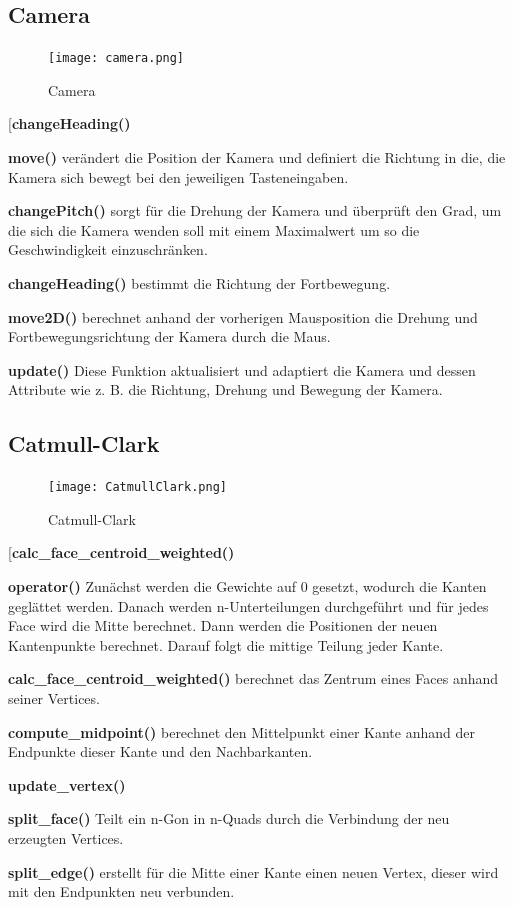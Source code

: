 \subsection{Camera}

\begin{figure}[H]
\centering
\texttt{[image: camera.png]}
\caption{Camera}
\label{fig3}
\end{figure}

\begin{labeling}[]{[\textbf{changeHeading()}}%
\item[\textbf{move()}] verändert die Position der Kamera und definiert die Richtung in die, die Kamera sich bewegt bei den jeweiligen Tasteneingaben.
\item[\textbf{changePitch()}] sorgt für die Drehung der Kamera und überprüft den Grad, um die sich die Kamera wenden soll mit einem Maximalwert um so die Geschwindigkeit einzuschränken.
\item[\textbf{changeHeading()}] bestimmt die Richtung der Fortbewegung.
\item[\textbf{move2D()}] berechnet anhand der vorherigen Mausposition die Drehung und Fortbewegungsrichtung der Kamera durch die Maus.
\item[\textbf{update()}] Diese Funktion aktualisiert und adaptiert die Kamera und dessen Attribute wie z. B. die Richtung, Drehung und Bewegung der Kamera.
\end{labeling}

\subsection{Catmull-Clark}

\begin{figure}[H]
\centering
\texttt{[image: CatmullClark.png]}
\caption{Catmull-Clark}
\label{fig4}
\end{figure}

\begin{labeling}[]{[\textbf{calc\_face\_centroid\_weighted()}}%
\item[\textbf{operator()}] Zunächst werden die Gewichte auf 0 gesetzt, wodurch die Kanten geglättet werden. Danach werden n-Unterteilungen durchgeführt und für jedes Face wird die Mitte berechnet. Dann werden die Positionen der neuen Kantenpunkte berechnet. Darauf folgt die mittige Teilung jeder Kante.
\item[\textbf{calc\_face\_centroid\_weighted()}] berechnet das Zentrum eines Faces anhand seiner Vertices.
\item[\textbf{compute\_midpoint()}] berechnet den Mittelpunkt einer Kante anhand der Endpunkte dieser Kante und den Nachbarkanten.
\item[\textbf{update\_vertex()}]
\item[\textbf{split\_face()}] Teilt ein n-Gon in n-Quads durch die Verbindung der neu erzeugten Vertices.
\item[\textbf{split\_edge()}] erstellt für die Mitte einer Kante einen neuen Vertex, dieser wird mit den Endpunkten neu verbunden.
\end{labeling}

